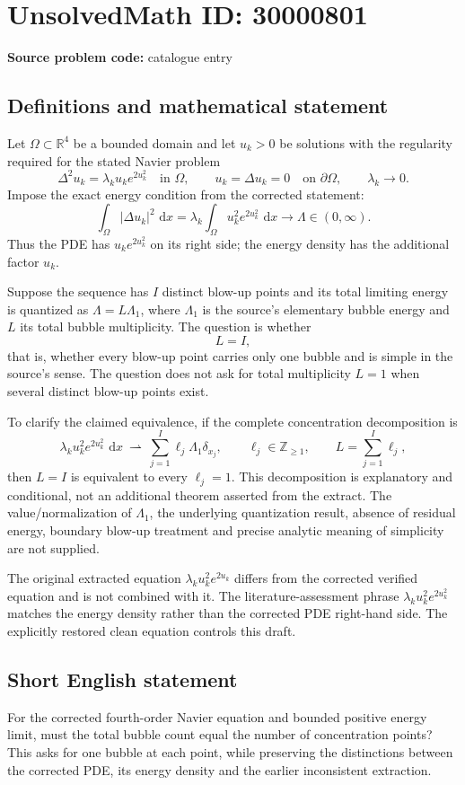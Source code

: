 \documentclass[11pt]{article}
\newcommand{\Z}{\mathbb{Z}}
\newcommand{\R}{\mathbb{R}}
\newcommand{\dd}{\,\mathrm{d}}
\begin{document}
\section*{UnsolvedMath ID: 30000801}
\textbf{Source problem code:} catalogue entry
\subsection{Definitions and mathematical statement}
Let $\Omega\subset\R^4$ be a bounded domain and let $u_k>0$ be solutions with the regularity required for the stated Navier problem
\[
\Delta^2u_k=\lambda_k u_k e^{2u_k^2}\quad\text{in }\Omega,
\qquad u_k=\Delta u_k=0\quad\text{on }\partial\Omega,
\qquad\lambda_k\to0.
\]
Impose the exact energy condition from the corrected statement:
\[
\int_\Omega|\Delta u_k|^2\,\dd x
=\lambda_k\int_\Omega u_k^2e^{2u_k^2}\,\dd x
\longrightarrow\Lambda\in(0,\infty).
\]
Thus the PDE has $u_k e^{2u_k^2}$ on its right side; the energy density has the additional factor $u_k$.

Suppose the sequence has $I$ distinct blow-up points and its total limiting energy is quantized as $\Lambda=L\Lambda_1$, where $\Lambda_1$ is the source's elementary bubble energy and $L$ its total bubble multiplicity. The question is whether
\[
L=I,
\]
that is, whether every blow-up point carries only one bubble and is simple in the source's sense. The question does not ask for total multiplicity $L=1$ when several distinct blow-up points exist.

To clarify the claimed equivalence, if the complete concentration decomposition is
\[
\lambda_k u_k^2e^{2u_k^2}\,\dd x
\ \rightharpoonup\ \sum_{j=1}^{I}\ell_j\Lambda_1\delta_{x_j},
\qquad\ell_j\in\Z_{\geq1},\qquad L=\sum_{j=1}^{I}\ell_j,
\]
then $L=I$ is equivalent to every $\ell_j=1$. This decomposition is explanatory and conditional, not an additional theorem asserted from the extract. The value/normalization of $\Lambda_1$, the underlying quantization result, absence of residual energy, boundary blow-up treatment and precise analytic meaning of simplicity are not supplied.

The original extracted equation $\lambda_k u_k^2e^{2u_k}$ differs from the corrected verified equation and is not combined with it. The literature-assessment phrase $\lambda_k u_k^2e^{2u_k^2}$ matches the energy density rather than the corrected PDE right-hand side. The explicitly restored clean equation controls this draft.
\subsection{Short English statement}
For the corrected fourth-order Navier equation and bounded positive energy limit, must the total bubble count equal the number of concentration points? This asks for one bubble at each point, while preserving the distinctions between the corrected PDE, its energy density and the earlier inconsistent extraction.
\end{document}
